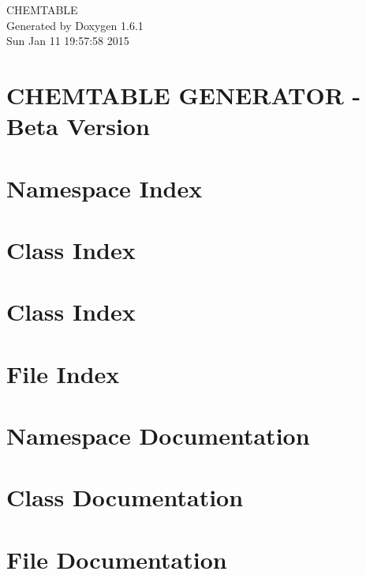 \documentclass[a4paper]{book}
\begin{document}
\hypersetup{pageanchor=false}
\begin{titlepage}
\vspace*{7cm}
\begin{center}
{\Large CHEMTABLE }\\
\vspace*{1cm}
{\large Generated by Doxygen 1.6.1}\\
\vspace*{0.5cm}
{\small Sun Jan 11 19:57:58 2015}\\
\end{center}
\end{titlepage}
\clearemptydoublepage
{}
\tableofcontents
\clearemptydoublepage
{}
\hypersetup{pageanchor=true}
\chapter{CHEMTABLE GENERATOR -\/ Beta Version}
\label{index}\hypertarget{index}{}
\chapter{Namespace Index}

\chapter{Class Index}

\chapter{Class Index}

\chapter{File Index}

\chapter{Namespace Documentation}




\chapter{Class Documentation}




























\chapter{File Documentation}


\printindex
\end{document}
